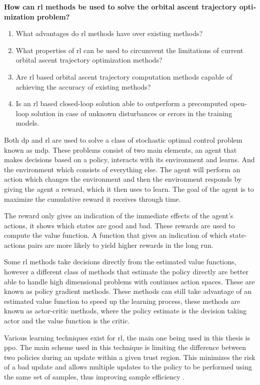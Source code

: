 \textbf{How can \acrlong{rl} methods be used to solve the orbital ascent trajectory opti­mization problem?}
\begin{enumerate}
  \item What advantages do \acrshort{rl} methods have over existing methods?
  \item What properties of \acrshort{rl} can be used to circumvent the limitations of current orbital ascent trajectory optimization methods?
  \item Are \acrshort{rl} based orbital ascent trajectory computation methods capable of achieving the accuracy of existing methods?
  \item Is an \acrshort{rl} based closed-loop solution able to outperform a precomputed open-loop solution in case of unknown disturbances or errors in the training models.
\end{enumerate}

Both \acrshort{dp} and \acrshort{rl} are used to solve a class of stochastic optimal control problem known as \acrfull{mdp}. These problems consist of two main elements, an agent that makes decisions based on a policy, interacts with its environment and learns. And the environment which consists of everything else. The agent will perform an action which changes the environment and then the environment responds by giving the agent a reward, which it then uses to learn. The goal of the agent is to maximize the cumulative reward it receives through time.

The reward only gives an indication of the immediate effects of the agent's actions, it shows which states are good and bad. These rewards are used to compute the value function. A function that gives an indication of which state-actions pairs are more likely to yield higher rewards in the long run.

Some \acrshort{rl} methods take decisions directly from the estimated value functions, however a different class of methods that estimate the policy directly are better able to handle high dimensional problems with continues action spaces. These are known as policy gradient methods. These methods can still take advantage of an estimated value function to speed up the learning process, these methods are known as actor-critic methods, where the policy estimate is the decision taking actor and the value function is the critic.

Various learning techniques exist for \acrshort{rl}, the main one being used in this thesis is \acrfull{ppo}. The main scheme used in this technique is limiting the difference between two policies during an update within a given trust region. This minimizes the risk of a bad update and allows multiple updates to the policy to be performed using the same set of samples, thus improving sample efficiency \cite{schulman2017proximal, schulman2015trust}.

